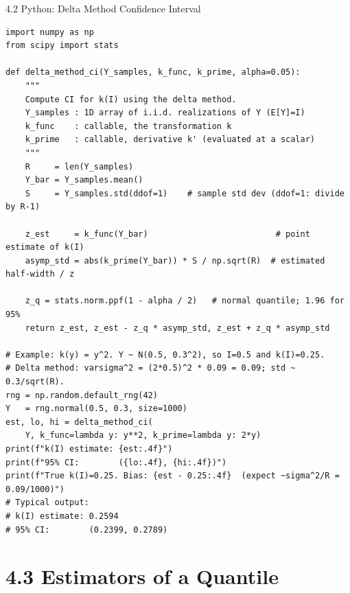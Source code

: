 \documentclass[aspectratio=169,10pt]{beamer}
\begin{document}
\begin{frame}[fragile]{4.2 Python: Delta Method Confidence Interval}
\begin{lstlisting}[style=python]
import numpy as np
from scipy import stats

def delta_method_ci(Y_samples, k_func, k_prime, alpha=0.05):
    """
    Compute CI for k(I) using the delta method.
    Y_samples : 1D array of i.i.d. realizations of Y (E[Y]=I)
    k_func    : callable, the transformation k
    k_prime   : callable, derivative k' (evaluated at a scalar)
    """
    R     = len(Y_samples)
    Y_bar = Y_samples.mean()
    S     = Y_samples.std(ddof=1)    # sample std dev (ddof=1: divide by R-1)

    z_est     = k_func(Y_bar)                          # point estimate of k(I)
    asymp_std = abs(k_prime(Y_bar)) * S / np.sqrt(R)  # estimated half-width / z

    z_q = stats.norm.ppf(1 - alpha / 2)   # normal quantile; 1.96 for 95%
    return z_est, z_est - z_q * asymp_std, z_est + z_q * asymp_std

# Example: k(y) = y^2. Y ~ N(0.5, 0.3^2), so I=0.5 and k(I)=0.25.
# Delta method: varsigma^2 = (2*0.5)^2 * 0.09 = 0.09; std ~ 0.3/sqrt(R).
rng = np.random.default_rng(42)
Y   = rng.normal(0.5, 0.3, size=1000)
est, lo, hi = delta_method_ci(
    Y, k_func=lambda y: y**2, k_prime=lambda y: 2*y)
print(f"k(I) estimate: {est:.4f}")
print(f"95% CI:        ({lo:.4f}, {hi:.4f})")
print(f"True k(I)=0.25. Bias: {est - 0.25:.4f}  (expect ~sigma^2/R = 0.09/1000)")
# Typical output:
# k(I) estimate: 0.2594
# 95% CI:        (0.2399, 0.2789)
\end{lstlisting}
\end{frame}



\section{4.3 Estimators of a Quantile}
\end{document}
